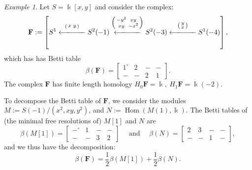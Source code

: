 \documentclass[12pt]{amsart}
\theoremstyle{definition}
\theoremstyle{remark}
\newtheorem{example}[lemma]{Example}
\newcommand{\Hom}{\operatorname{Hom}} %
\newcommand{\kk}{\Bbbk}
\newcommand{\bG}{\mathbf{G}}
\newcommand{\FF}{\mathbf{F}}
\newcommand{\zp}{\circ}
\newcommand{\david}[1]{{\color{red} \sf $\clubsuit\clubsuit\clubsuit$ David: [#1]}}
\begin{document}
\begin{example}
Let $S=\kk[x,y]$ and consider the complex:
\[
\FF := \left[S^1\overset{\left(\begin{smallmatrix}x&y\end{smallmatrix}\right)}{\xlongleftarrow{\hspace*{1.1cm}}} S^2(-1)\overset{\left(\begin{smallmatrix}-y^2&xy\\xy&-x^2\end{smallmatrix}\right)}{\xlongleftarrow{\hspace*{1.1cm}}} S^2(-3)\overset{\left(\begin{smallmatrix}y\\x\end{smallmatrix}\right)}{\xlongleftarrow{\hspace*{1.1cm}}} S^1(-4)\right],
\]
which has has Betti table 
$$
\beta(\FF)=\begin{bmatrix} 1^\circ&2&-&-\\-&-&2&1\end{bmatrix}.
$$
The complex $\FF$ has finite length homology $H_{0}\FF = \kk,\ H_{1}\FF = \kk(-2)$. 

To decompose the Betti table of $\FF$, we consider the
modules $M:=S(-1)/(x^2,xy,y^2)$, and $N:=\Hom(M(1),\kk)$.  The Betti tables of (the minimal free resolutions of) $M[1]$ and $N$ are
\[
\beta(M[1])=\begin{bmatrix}
-^\zp&1&-&-\\
-&-&3&2
\end{bmatrix}
\quad \text{ and } \quad
\beta(N)=\begin{bmatrix}
2&3&-&-\\
-&-&1&-
\end{bmatrix},
\]
and we thus have the decomposition:
\[
\beta(\FF)=
\frac{1}{2}\beta(M[1])
+
\frac{1}{2}\beta(N).
\]




\end{example}
\end{document}
